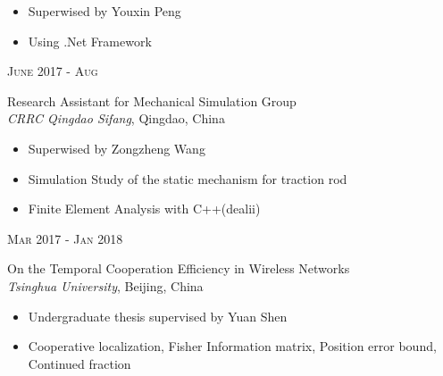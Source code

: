 \documentclass[10pt]{article} %
\begin{document}
{\begin{minipage}[t]{0.5\textwidth}
\normalsize{\begin{itemize}
		\item Superwised by Youxin Peng
		\item Using .Net Framework 
\end{itemize}}

{\raggedleft\textsc{June 2017 - Aug}\par}

{\raggedright\large Research Assistant for Mechanical Simulation Group\\
\textit{CRRC Qingdao Sifang}, Qingdao, China\\[5pt]}

\normalsize{\begin{itemize}
		\item Superwised by Zongzheng Wang
		\item Simulation Study of the static mechanism for traction rod 
		\item Finite Element Analysis with C++(dealii)
\end{itemize}}

{\raggedleft\textsc{Mar 2017 - Jan 2018}\par}

{\raggedright\large On the Temporal Cooperation Efficiency in Wireless Networks\\
	\textit{Tsinghua University}, Beijing, China\\[5pt]}

\normalsize{\begin{itemize}
		\item Undergraduate thesis supervised by Yuan Shen
		\item Cooperative localization, Fisher Information matrix, Position error bound, Continued fraction
\end{itemize}}




\end{minipage} %
\hfill
\begin{minipage}[t]{0.44\textwidth} %
\vspace{0pt} %



\end{minipage}}
\end{document}
